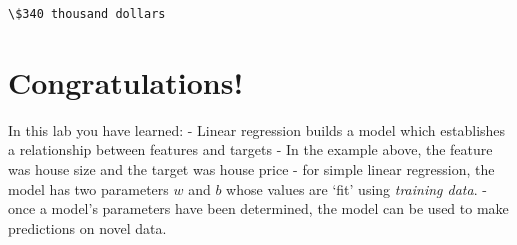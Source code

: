 \documentclass[11pt]{article}
\makeatletter
\newcommand{\boxspacing}{\kern\kvtcb@left@rule\kern\kvtcb@boxsep}
\newcommand{\prompt}[4]{
        \ttfamily\llap{{\color{#2}[#3]:\hspace{3pt}#4}}\vspace{-\baselineskip}
    }
\makeatother
\begin{document}
    \begin{Verbatim}[commandchars=\\\{\}]
\$340 thousand dollars
    \end{Verbatim}

    \hypertarget{congratulations}{%
\section{Congratulations!}\label{congratulations}}

In this lab you have learned: - Linear regression builds a model which
establishes a relationship between features and targets - In the example
above, the feature was house size and the target was house price - for
simple linear regression, the model has two parameters \(w\) and \(b\)
whose values are `fit' using \emph{training data}. - once a model's
parameters have been determined, the model can be used to make
predictions on novel data.

    \begin{tcolorbox}[breakable, size=fbox, boxrule=1pt, pad at break*=1mm,colback=cellbackground, colframe=cellborder]
\prompt{In}{incolor}{ }{\boxspacing}
\begin{Verbatim}[commandchars=\\\{\}]

\end{Verbatim}
\end{tcolorbox}


    
    
    
\end{document}

